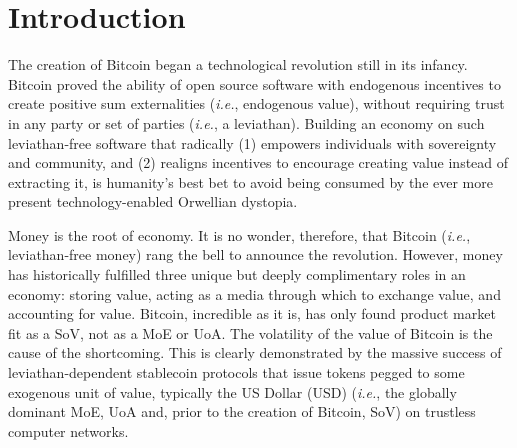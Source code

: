 \documentclass[tikz]{article}
\begin{document}
\newpage

\thispagestyle{empty} %

\cleardoublepage
{}
{\large\tableofcontents} %
\cleardoublepage
{}

\newpage

\setcounter{page}{6} %


\section{Introduction}

The creation of Bitcoin began a technological revolution still in its infancy. Bitcoin proved the ability of open source software with endogenous incentives to create positive sum externalities (\textit{i.e.}, endogenous value), without requiring trust in any party or set of parties (\textit{i.e.}, a leviathan). Building an economy on such leviathan-free software that radically (1) empowers individuals with sovereignty and community, and (2) realigns incentives to encourage creating value instead of extracting it, is humanity's best bet to avoid being consumed by the ever more present technology-enabled Orwellian dystopia.

\vspace*{-0.1cm}

Money is the root of economy. It is no wonder, therefore, that Bitcoin (\textit{i.e.}, leviathan-free money) rang the bell to announce the revolution. However, money has historically fulfilled three unique but deeply complimentary roles in an economy: storing value, acting as a media through which to exchange value, and accounting for value. Bitcoin, incredible as it is, has only found product market fit as a SoV, not as a MoE or UoA. The volatility of the value of Bitcoin is the cause of the shortcoming. This is clearly demonstrated by the massive success of leviathan-dependent stablecoin protocols that issue tokens pegged to some exogenous unit of value, typically the US Dollar (USD) (\textit{i.e.}, the globally dominant MoE, UoA and, prior to the creation of Bitcoin, SoV) on trustless computer networks.

\vspace*{-0.1cm}
\end{document}
